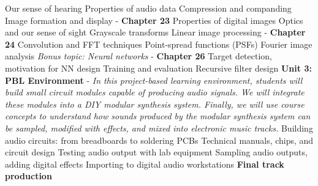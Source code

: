 \documentclass[10pt]{article}
\begin{document}
\begin{outline}[enumerate]
\3 Our sense of hearing
\3 Properties of audio data
\3 Compression and companding
\2 Image formation and display - \textbf{Chapter 23}
\3 Properties of digital images
\3 Optics and our sense of sight
\3 Grayscale transforms
\2 Linear image processing - \textbf{Chapter 24}
\3 Convolution and FFT techniques
\3 Point-spread functions (PSFs)
\3 Fourier image analysis
\2 \textit{Bonus topic: Neural networks} - \textbf{Chapter 26}
\3 Target detection, motivation for NN design
\3 Training and evaluation
\3 Recursive filter design
\1 \textbf{Unit 3: PBL Environment} - \textit{In this project-based learning environment, students will build small circuit modules capable of producing audio signals.  We will integrate these modules into a DIY modular synthesis system.  Finally, we will use course concepts to understand how sounds produced by the modular synthesis system can be sampled, modified with effects, and mixed into electronic music tracks.}
\2 Building audio circuits: from breadboards to soldering PCBs
\2 Technical manuals, chips, and circuit design
\2 Testing audio output with lab equipment
\2 Sampling audio outputs, adding digital effects
\2 Importing to digital audio workstations
\2 \textbf{Final track production}
\end{outline}
\end{document}
